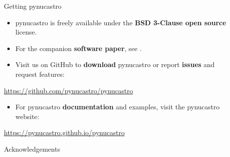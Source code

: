 \documentclass[final]{beamer}
\newlength{\sepwid}
\newlength{\onecolwid}
\newlength{\twocolwid}
\begin{document}
\begin{frame}[t]
\begin{columns}[t]
\begin{column}{\twocolwid}

\end{column} %

\begin{column}{\sepwid}\end{column} %

\begin{column}{\onecolwid} %


  
\begin{block}{Getting pynucastro}

\begin{itemize}
\item pynucastro is freely available under the \textbf{BSD 3-Clause open source} license.
\item For the companion \textbf{software paper}, see \cite{pynucastro.joss.2018}.
\item Visit us on GitHub to \textbf{download} pynucastro or report \textbf{issues} and request features:
\end{itemize}

\url{https://github.com/pynucastro/pynucastro}

\begin{itemize}
\item For pynucastro \textbf{documentation} and examples, visit the pynucastro website:
\end{itemize}

\url{https://pynucastro.github.io/pynucastro}

\end{block}



\begin{block}{Acknowledgements}


\end{block}
\end{column}
\end{columns}
\end{frame}
\end{document}
